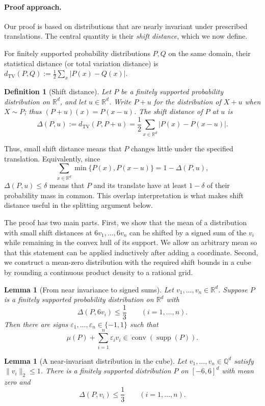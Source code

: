 \documentclass{article}
\newtheorem{lemma}[theorem]{Lemma}
\newtheorem{definition}[theorem]{Definition}
\newcommand{\R}{\mathbb{R}}
\newcommand{\Q}{\mathbb{Q}}
\newcommand{\eps}{\varepsilon}
\newcommand{\SD}[2]{d_{\mathrm{TV}}(#1,#2)}
\newcommand{\SDS}[2]{\Delta(#1,#2)}
\newcommand{\supp}{\operatorname{supp}}
\begin{document}
\paragraph{Proof approach.}
Our proof is based on distributions that are nearly invariant under
prescribed translations. The central quantity is their \emph{shift
distance}, which we now define.

For finitely supported probability distributions $P,Q$ on the same
domain, their statistical distance (or total variation distance) is
$\SD{P}{Q}:=\frac12\sum_x|P(x)-Q(x)|$.

\begin{definition}[Shift distance]
\label{def:shift-distance}
Let $P$ be a finitely supported probability distribution on $\R^d$,
and let $u\in\R^d$. Write $P+u$ for the distribution of $X+u$
when $X\sim P$; thus $(P+u)(x)=P(x-u)$.
The \emph{shift distance} of $P$ at $u$ is
\[
\SDS{P}{u}
:=\SD{P}{P+u}
=\frac12\sum_{x\in\R^d}|P(x)-P(x-u)|.
\]
\end{definition}

Thus, small shift distance means that $P$ changes little under the
specified translation.
Equivalently, since
\[
\sum_{x\in\R^d}\min\{P(x),P(x-u)\}=1-\SDS{P}{u},
\]
$\SDS{P}{u}\le\delta$ means that $P$ and its translate have at
least $1-\delta$ of their probability mass in common. This overlap
interpretation is what makes shift distance useful in the splitting
argument below.

The proof has two main parts. First, we show that the mean of a
distribution with small shift distances at $6v_1,\ldots,6v_n$ can
be shifted by a signed sum of the $v_i$ while remaining in the
convex hull of its support. We allow an arbitrary mean so that
this statement can be applied inductively after adding a coordinate.
Second, we construct a mean-zero distribution with the required
shift bounds in a cube by rounding a continuous product density
to a rational grid.

\begin{lemma}[From near invariance to signed sums]
\label{lemma:balancing}
Let $v_1,\ldots,v_n\in\R^d$. Suppose $P$ is a finitely supported
probability distribution on $\R^d$ with
\[
\SDS{P}{6v_i}\le\frac13
\qquad (i=1,\ldots,n).
\]
Then there are signs $\eps_1,\ldots,\eps_n\in\{-1,1\}$ such that
\[
\mu(P)+\sum_{i=1}^n\eps_i v_i\in\operatorname{conv}(\supp(P)).
\]
\end{lemma}

\begin{lemma}[A near-invariant distribution in the cube]
\label{lemma:cube}
Let $v_1,\ldots,v_n\in\Q^d$ satisfy $\|v_i\|_2\le1$.
There is a finitely supported distribution $P$ on $[-6,6]^d$
with mean zero and
\[
\SDS{P}{v_i}\le\frac13
\qquad (i=1,\ldots,n).
\]
\end{lemma}
\end{document}
